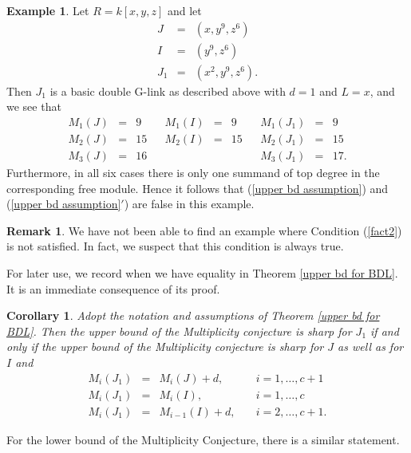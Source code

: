 \documentclass[12pt,twoside]{amsart}
\numberwithin{equation}{section}
\newtheorem{corollary}[theorem]{Corollary}
\theoremstyle{definition}
\newtheorem{remark}[theorem]{Remark}
\newtheorem{example}[theorem]{Example}
\begin{document}
\medskip

\begin{example}\label{all top deg split}
Let $R = k[x,y,z]$ and let
\[
\begin{array}{rcl}
 J & = & (x, y^9, z^6) \\
 I &  = & (y^9, z^6) \\
J_1 & = & (x^2,  y^9, z^6).
\end{array}
\]
Then $J_1$ is a basic double G-link as described above with $d=1$ and $L=x$, and we see
that
\[
\begin{array}{rclcrclcrcl}
M_1(J) & = & 9 && M_1(I) & = &  9 && M_1(J_1) & = & 9 \\
M_2(J) & = & 15 && M_2(I) & = & 15 && M_2(J_1) & = & 15 \\
M_3(J) & = & 16 && &&&& M_3(J_1) & = & 17.
\end{array}
\]
Furthermore, in all six cases there is only one summand of top degree in the
corresponding free  module.  Hence it follows that (\ref{upper bd assumption}) and
(\ref{upper bd assumption}$'$) are false in this example.
\end{example}

\medskip

\begin{remark}
We have not been able to find an example where Condition (\ref{fact2}) is not satisfied.
In fact, we suspect that this condition is always true.
\end{remark}

For later use, we record when we have equality in Theorem \ref{upper bd for BDL}. It is
an immediate consequence of its proof.

\begin{corollary} \label{cor-sharp-upper}
Adopt the notation and assumptions of Theorem \ref{upper bd for BDL}. Then the upper
bound of the Multiplicity conjecture is sharp for $J_1$ if and only if the upper bound of
the Multiplicity conjecture is sharp for $J$ as well as for $I$ and
$$
\begin{array}{rcll}
M_i (J_1) & = & M_i (J) + d, \quad  & i = 1,\ldots,c+1 \\
M_i (J_1) & =  & M_i (I), \quad & i = 1,\ldots,c \\
M_i (J_1) & =  & M_{i-1} (I) + d , \quad & i = 2,\ldots,c+1.
\end{array}
$$
\end{corollary}

For the lower bound of the Multiplicity Conjecture, there is a similar statement.
\end{document}

